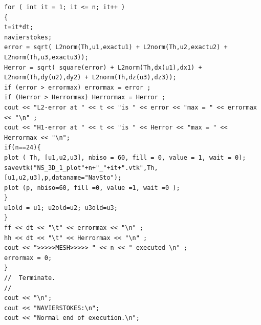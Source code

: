 \documentclass[a4paper,10pt]{article}
\begin{document}
\begin{lstlisting}
for ( int it = 1; it <= n; it++ )
{
t=it*dt;
navierstokes;
error = sqrt( L2norm(Th,u1,exactu1) + L2norm(Th,u2,exactu2) + L2norm(Th,u3,exactu3));
Herror = sqrt( square(error) + L2norm(Th,dx(u1),dx1) + L2norm(Th,dy(u2),dy2) + L2norm(Th,dz(u3),dz3));
if (error > errormax) errormax = error ;
if (Herror > Herrormax) Herrormax = Herror ;
cout << "L2-error at " << t << "is " << error << "max = " << errormax << "\n" ;
cout << "H1-error at " << t << "is " << Herror << "max = " << Herrormax << "\n"; 
if(n==24){
plot ( Th, [u1,u2,u3], nbiso = 60, fill = 0, value = 1, wait = 0);
savevtk("NS_3D_1_plot"+n+"_"+it+".vtk",Th,[u1,u2,u3],p,dataname="NavSto");
plot (p, nbiso=60, fill =0, value =1, wait =0 );
}
u1old = u1; u2old=u2; u3old=u3;
}
ff << dt << "\t" << errormax << "\n" ;
hh << dt << "\t" << Herrormax << "\n" ;
cout << ">>>>>MESH>>>>> " << n << " executed \n" ;
errormax = 0;
}
//  Terminate.
//
cout << "\n";
cout << "NAVIERSTOKES:\n";
cout << "Normal end of execution.\n";
\end{lstlisting}
\end{document}
